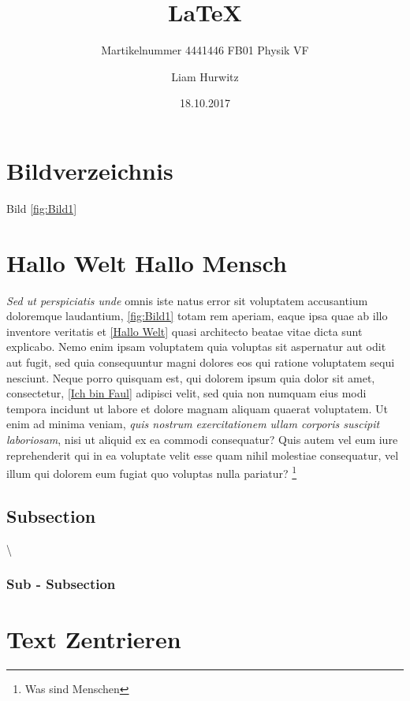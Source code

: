 \documentclass[]{scrartcl}
\title{\LaTeX}
\author{Liam Hurwitz}
\date{18.10.2017}
\subtitle{Martikelnummer 4441446 FB01 Physik VF}
\begin{document}
\maketitle
\tableofcontents
\section*{Bildverzeichnis}
Bild \ref{fig:Bild1}

\section {Hallo Welt Hallo Mensch }
\emph{Sed ut perspiciatis unde} omnis iste natus error sit voluptatem accusantium doloremque laudantium, \ref{fig:Bild1} totam rem aperiam, eaque ipsa quae ab illo inventore veritatis et \ref{Hallo Welt} quasi architecto beatae vitae dicta sunt explicabo. Nemo enim ipsam voluptatem quia voluptas sit aspernatur aut odit aut fugit, sed quia consequuntur magni dolores eos qui ratione voluptatem sequi nesciunt. Neque porro quisquam est, qui dolorem ipsum quia dolor sit amet, consectetur,  \ref{Ich bin Faul} adipisci velit, sed quia non numquam eius modi tempora incidunt ut labore et dolore magnam aliquam quaerat voluptatem. Ut enim ad minima veniam, \emph{\emph{quis nostrum exercitationem \pageref{Hallo Welt} ullam corporis suscipit laboriosam}}, nisi ut aliquid ex ea commodi consequatur? Quis autem vel eum iure reprehenderit qui in ea voluptate velit esse quam nihil molestiae consequatur, vel illum qui dolorem eum fugiat quo voluptas nulla pariatur? \footnote{Was sind Menschen}

\subsection {Subsection}
\textbackslash \^  \\
\lipsum[1-1]
\subsubsection *{Sub - Subsection}
\lipsum[2-7]

\section{Text Zentrieren}
\begin{flushleft}
\lipsum[1-1]
\end{flushleft}
\begin{quote}
\lipsum[1-1]
\end{quote}
\begin{center}
\lipsum[1-1]
\end{center}
\end{document}
